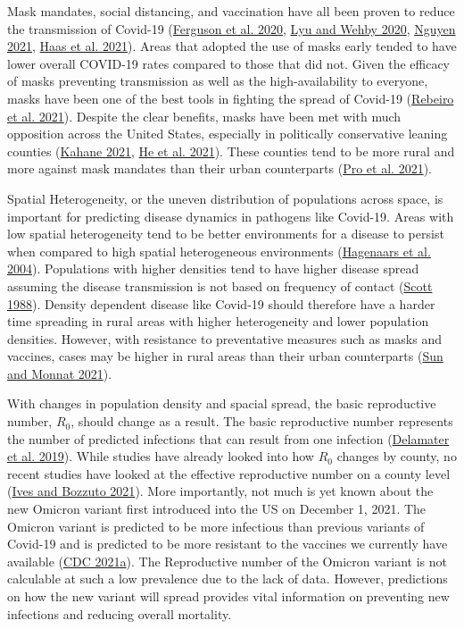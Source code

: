 \documentclass[
  12pt,
]{article}
\begin{document}
Mask mandates, social distancing, and vaccination have all been proven to reduce the transmission of Covid-19 (\protect\hyperlink{ref-ferguson_report_2020}{Ferguson et al. 2020}, \protect\hyperlink{ref-lyu_community_2020}{Lyu and Wehby 2020}, \protect\hyperlink{ref-nguyen_mask_2021}{Nguyen 2021}, \protect\hyperlink{ref-haas_infections_2021}{Haas et al. 2021}). Areas that adopted the use of masks early tended to have lower overall COVID-19 rates compared to those that did not. Given the efficacy of masks preventing transmission as well as the high-availability to everyone, masks have been one of the best tools in fighting the spread of Covid-19 (\protect\hyperlink{ref-rebeiro_impact_2021}{Rebeiro et al. 2021}). Despite the clear benefits, masks have been met with much opposition across the United States, especially in politically conservative leaning counties (\protect\hyperlink{ref-kahane_politicizing_2021}{Kahane 2021}, \protect\hyperlink{ref-he_why_2021}{He et al. 2021}). These counties tend to be more rural and more against mask mandates than their urban counterparts (\protect\hyperlink{ref-pro_us_2021}{Pro et al. 2021}).

Spatial Heterogeneity, or the uneven distribution of populations across space, is important for predicting disease dynamics in pathogens like Covid-19. Areas with low spatial heterogeneity tend to be better environments for a disease to persist when compared to high spatial heterogeneous environments (\protect\hyperlink{ref-hagenaars_spatial_2004}{Hagenaars et al. 2004}). Populations with higher densities tend to have higher disease spread assuming the disease transmission is not based on frequency of contact (\protect\hyperlink{ref-scott_impact_1988}{Scott 1988}). Density dependent disease like Covid-19 should therefore have a harder time spreading in rural areas with higher heterogeneity and lower population densities. However, with resistance to preventative measures such as masks and vaccines, cases may be higher in rural areas than their urban counterparts (\protect\hyperlink{ref-sun_rural-urban_2021}{Sun and Monnat 2021}).

With changes in population density and spacial spread, the basic reproductive number, \(R_0\), should change as a result. The basic reproductive number represents the number of predicted infections that can result from one infection (\protect\hyperlink{ref-delamater_complexity_2019}{Delamater et al. 2019}). While studies have already looked into how \(R_0\) changes by county, no recent studies have looked at the effective reproductive number on a county level (\protect\hyperlink{ref-ives_estimating_2021}{Ives and Bozzuto 2021}). More importantly, not much is yet known about the new Omicron variant first introduced into the US on December 1, 2021. The Omicron variant is predicted to be more infectious than previous variants of Covid-19 and is predicted to be more resistant to the vaccines we currently have available (\protect\hyperlink{ref-cdc_omicron_2021}{CDC 2021a}). The Reproductive number of the Omicron variant is not calculable at such a low prevalence due to the lack of data. However, predictions on how the new variant will spread provides vital information on preventing new infections and reducing overall mortality.
\end{document}
